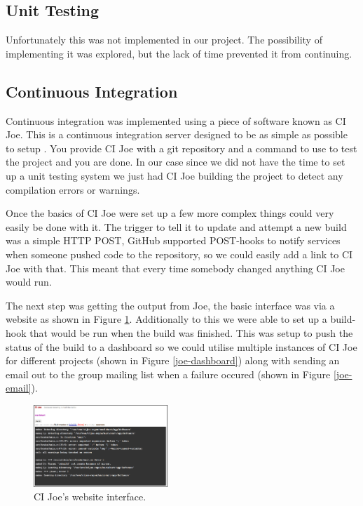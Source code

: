   \subsection{Unit Testing}

    Unfortunately this was not implemented in our project.  The possibility of
    implementing it was explored, but the lack of time prevented it from
    continuing.

  \subsection{Continuous Integration}

    Continuous integration was implemented using a piece of software known as CI
    Joe.  This is a continuous integration server designed to be as simple as
    possible to setup \cite{ci-joe}.  You provide CI Joe with a git repository and a command
    to use to test the project and you are done.  In our case since we did not
    have the time to set up a unit testing system we just had CI Joe building
    the project to detect any compilation errors or warnings.

    Once the basics of CI Joe were set up a few more complex things could very
    easily be done with it.  The trigger to tell it to update and attempt a new
    build was a simple HTTP POST, GitHub supported POST-hooks to notify services
    when someone pushed code to the repository, so we could easily add a link to
    CI Joe with that.  This meant that every time somebody changed anything CI
    Joe would run.

    The next step was getting the output from Joe, the basic interface was via a
    website as shown in Figure \ref{joe-website}.  Additionally to this we were
    able to set up a build-hook that would be run when the build was finished.
    This was setup to push the status of the build to a dashboard so we could
    utilise multiple instances of CI Joe for different projects (shown in Figure
    \ref{joe-dashboard}) along with sending an email out to the group mailing
    list when a failure occured (shown in Figure \ref{joe-email}).

    \begin{figure}
    \centering
    \includegraphics[width=0.45\textwidth]{images/joe-website}
    \caption{CI Joe's website interface.}
    \label{joe-website}
    \end{figure}

